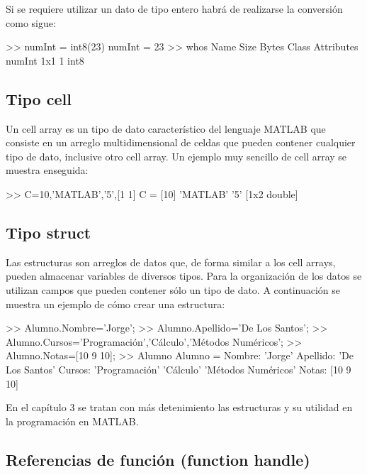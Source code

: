 Si se requiere utilizar un dato de tipo entero habrá de realizarse la
conversión como sigue:

\begin{matlab}
>> numInt = int8(23)
numInt =
   23
>> whos
  Name        Size            Bytes  Class    Attributes
  numInt      1x1                 1  int8               
\end{matlab}

\subsection{Tipo cell}

Un cell array es un tipo de dato característico del lenguaje MATLAB que
consiste en un arreglo multidimensional de celdas que pueden contener
cualquier tipo de dato, inclusive otro cell array. Un ejemplo muy
sencillo de cell array se muestra enseguida:

\begin{matlab}
>> C={10,'MATLAB','5',[1 1]}
C = 
    [10]    'MATLAB'    '5'    [1x2 double]
\end{matlab}

\subsection{Tipo struct}\label{tipo-struct}

Las estructuras son arreglos de datos que, de forma similar a los cell
arrays, pueden almacenar variables de diversos tipos. Para la
organización de los datos se utilizan campos que pueden contener sólo un
tipo de dato. A continuación se muestra un ejemplo de cómo crear una
estructura:

\begin{matlab}
>> Alumno.Nombre='Jorge';
>> Alumno.Apellido='De Los Santos';
>> Alumno.Cursos={'Programación','Cálculo','Métodos Numéricos'};
>> Alumno.Notas=[10 9 10];
>> Alumno
Alumno = 
      Nombre: 'Jorge'
    Apellido: 'De Los Santos'
      Cursos: {'Programación'  'Cálculo'  'Métodos Numéricos'}
       Notas: [10 9 10]
\end{matlab}

En el capítulo 3 se tratan con más detenimiento las estructuras y su
utilidad en la programación en MATLAB.

\subsection{Referencias de función (function handle)}\label{referencias-de-funcion-function-handle}

